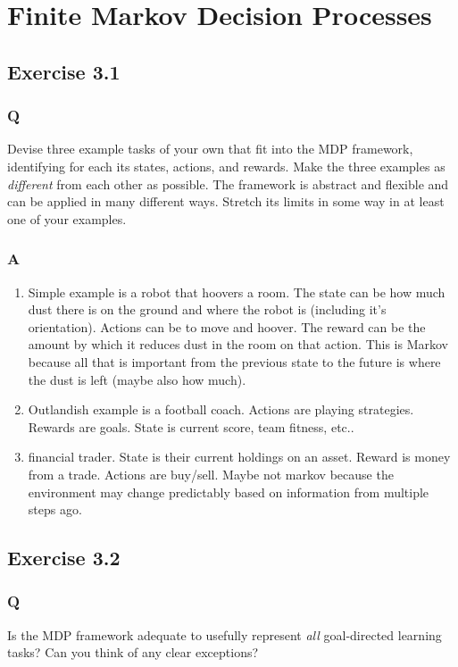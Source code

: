\section{Finite Markov Decision Processes}

\subsection{Exercise 3.1}
\subsubsection{Q}
Devise three example tasks of your own that fit into the MDP framework, identifying for each its states, actions, and rewards. Make the three examples as \emph{different} from each other as possible. The framework is abstract and flexible and can be applied in many different ways. Stretch its limits in some way in at least one of your examples.

\subsubsection{A}
\begin{enumerate}
    \item Simple example is a robot that hoovers a room. The state can be how much dust there is on the ground and where the robot is (including it's orientation). Actions can be to move and hoover. The reward can be the amount by which it reduces dust in the room on that action. This is Markov because all that is important from the previous state to the future is where the dust is left (maybe also how much).
    \item Outlandish example is a football coach. Actions are playing strategies. Rewards are goals. State is current score, team fitness, etc..
    \item financial trader. State is their current holdings on an asset. Reward is money from a trade. Actions are buy/sell. Maybe not markov because the environment may change predictably based on information from multiple steps ago.
\end{enumerate}

\subsection{Exercise 3.2}
\subsubsection{Q}
Is the MDP framework adequate to usefully represent \emph{all} goal-directed learning tasks? Can you think of any clear exceptions?

